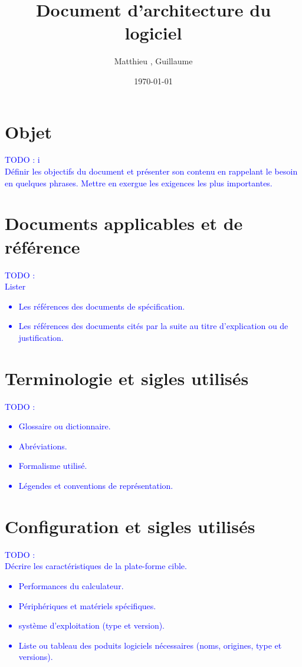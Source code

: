 \documentclass{../res/univ-projet}
\title{Document d'architecture du logiciel}
\author{Matthieu \bsc{Fin}, Guillaume \bsc{Leroy}}
\date{\today}
\begin{document}
\maketitle
\newpage
\tableofcontents
\newpage

\section{Objet}
  \textcolor{blue}{
    TODO : i\\
    Définir les objectifs du document et présenter son contenu en rappelant le
    besoin en quelques phrases. Mettre en exergue les exigences les plus importantes.
  }


\section{Documents applicables et de référence}
  \textcolor{blue}{
    TODO : \\
    Lister \\
    {\begin{itemize}
      \item Les références des documents de spécification.
      \item Les références des documents cités par la suite au titre d'explication ou de 
      justification.
    \end{itemize}}
  }

\section{Terminologie et sigles utilisés}
  \textcolor{blue}{
    TODO : \\
    {\begin{itemize}
      \item Glossaire ou dictionnaire.
      \item Abréviations.
      \item Formalisme utilisé.
      \item Légendes et conventions de représentation.
    \end{itemize}}
  }

\section{Configuration et sigles utilisés}
  \textcolor{blue}{
    TODO : \\
    Décrire les caractéristiques de la plate-forme cible. \\
    {\begin{itemize}
      \item Performances du calculateur.
      \item Périphériques et matériels spécifiques.
      \item système d'exploitation (type et version).
      \item Liste ou tableau des poduits logiciels nécessaires (noms, origines, type et versions).
    \end{itemize}}
  }
\end{document}
